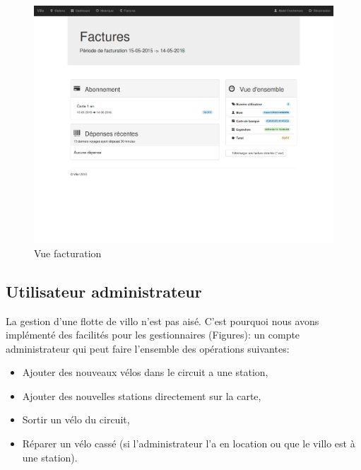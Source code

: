 \documentclass[a4paper,10pt]{article}
\begin{document}
\begin{figure}[H]
  \centering
  \includegraphics[scale=0.2]{factures.png}
  \caption{\label{fig:factures} Vue facturation}
\end{figure}

\subsection{Utilisateur administrateur}
La gestion d'une flotte de villo n'est pas aisé. C'est pourquoi nous avons implémenté
des facilités pour les gestionnaires (Figures): un compte administrateur qui peut faire
l'ensemble des opérations suivantes: 
\begin{itemize}
	\item Ajouter des nouveaux vélos dans le circuit a une station,
	\item Ajouter des nouvelles stations directement sur la carte,
	\item Sortir un vélo du circuit,
	\item Réparer un vélo cassé (si l'administrateur l'a en location ou que le villo est à une station).
\end{itemize}
\end{document}
